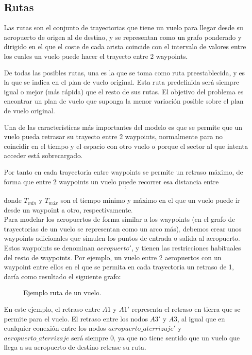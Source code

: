 \subsection*{Rutas}
Las rutas son el conjunto de trayectorias que tiene un vuelo para llegar desde su aeropuerto de origen al de destino, y se representan como un grafo ponderado y dirigido en el que el coste de cada arista coincide con el intervalo de valores entre los cuales un vuelo puede hacer el trayecto entre 2 waypoints.

De todas las posibles rutas, una es la que se toma como ruta preestablecida, y es la que se indica en el plan de vuelo original. Esta ruta predefinida será siempre igual o mejor (más rápida) que el resto de sus rutas. El objetivo del problema es encontrar un plan de vuelo que suponga la menor variación posible sobre el plan de vuelo original.

Una de las características más importantes del modelo es que se permite que un vuelo pueda retrasar su trayecto entre 2 waypoints, normalmente para no coincidir en el tiempo y el espacio con otro vuelo o porque el sector al que intenta acceder está sobrecargado.

Por tanto en cada trayectoria entre waypoints se permite un retraso máximo, de forma que entre 2 waypoints un vuelo puede recorrer esa distancia entre
\begin{equation}
[T_{mín} , T_{máx}],
\end{equation}

\noindent donde $T_{mín}$ y $T_{máx}$ son el tiempo mínimo y máximo en el que un vuelo puede ir desde un waypoint a otro, respectivamente.\\

Para modelar los aeropuertos de forma similar a los waypoints (en el grafo de trayectorias de un vuelo se representan como un arco más), debemos crear unos waypoints adicionales que simulen los puntos de entrada o salida al aeropuerto. Estos waypoints se denominan $aeropuerto'$, y tienen las restricciones habituales del resto de waypoints. Por ejemplo, un vuelo entre 2 aeropuertos con un waypoint entre ellos en el que se permita en cada trayectoria un retraso de 1, daría como resultado el siguiente grafo:
\begin{figure}[h]
	\centering
	
	\caption{Ejemplo ruta de un vuelo.}
	\label{fig: Ejemplo ruta de un vuelo}
\end{figure}

En este ejemplo, el retraso entre $A1$ y $A1'$ representa el retraso en tierra que se permite para el vuelo. El retraso entre los nodos $A3'$ y $A3$, al igual que en cualquier conexión entre los nodos $aeropuerto\_aterrizaje'$ y $aeropuerto\_aterrizaje$ será siempre 0, ya que no tiene sentido que un vuelo que llega a su aeropuerto de destino retrase su ruta.


